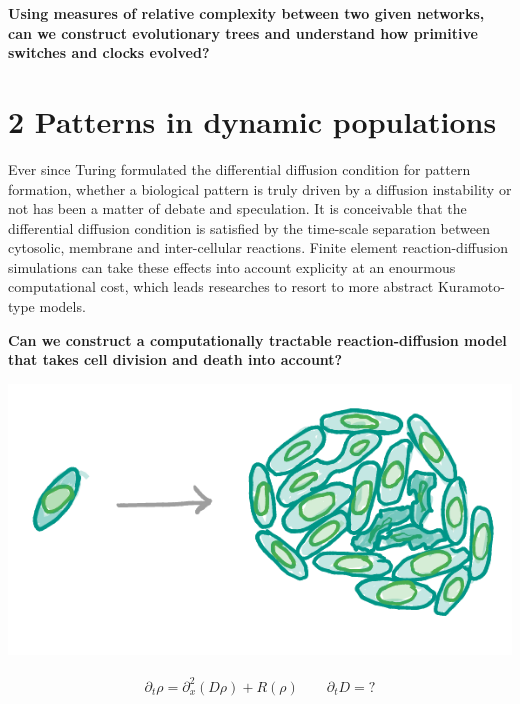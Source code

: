 \documentclass[a0,portrait]{a0poster}
\begin{document}
\begin{tcolorbox}[boxrule=2pt,arc=3.4pt,boxsep=2mm]
\begin{center}\color{DarkRed}
\textbf{Using measures of relative complexity between two given networks,
can we construct evolutionary trees and understand how primitive switches
and clocks evolved?}
\end{center}
\end{tcolorbox}

\section*{2 Patterns in dynamic populations}
Ever since Turing formulated the differential diffusion condition \cite{}
for pattern formation, whether a biological pattern is truly driven by a
diffusion instability or not has been a matter of debate and speculation.
\medbreak\medbreak\noindent
It is conceivable that the differential diffusion condition is satisfied
by the time-scale separation between cytosolic, membrane and inter-cellular
reactions.
\medbreak\medbreak\noindent
Finite element reaction-diffusion simulations can take these effects into
account explicity at an enourmous computational cost, which leads researches to
resort to more abstract Kuramoto-type models.
\medbreak
\begin{tcolorbox}[boxrule=2pt,arc=3.4pt,boxsep=2mm]
\begin{center}\color{DarkRed}
\textbf{Can we construct a computationally tractable reaction-diffusion model
that takes cell division and death into account?}
\end{center}
\end{tcolorbox}
\begin{center}
\includegraphics[width=0.9\linewidth]{population}
\end{center}
\large\begin{align*}
	\partial_t\rho=\partial_x^2(D\rho)+R(\rho)\qquad
	\partial_tD=?
\end{align*}
\end{document}
